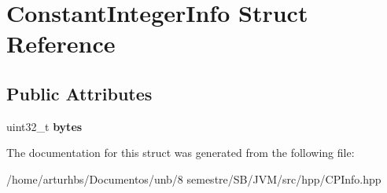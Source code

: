 \hypertarget{structConstantIntegerInfo}{}\section{Constant\+Integer\+Info Struct Reference}
\label{structConstantIntegerInfo}
\subsection*{Public Attributes}
\begin{DoxyCompactItemize}
\item 
uint32\+\_\+t {\bfseries bytes}\hypertarget{structConstantIntegerInfo_a809111b4b66377eb519a645632f7114a}{}\label{structConstantIntegerInfo_a809111b4b66377eb519a645632f7114a}

\end{DoxyCompactItemize}


The documentation for this struct was generated from the following file\+:\begin{DoxyCompactItemize}
\item 
/home/arturhbs/\+Documentos/unb/8 semestre/\+S\+B/\+J\+V\+M/src/hpp/C\+P\+Info.\+hpp\end{DoxyCompactItemize}
